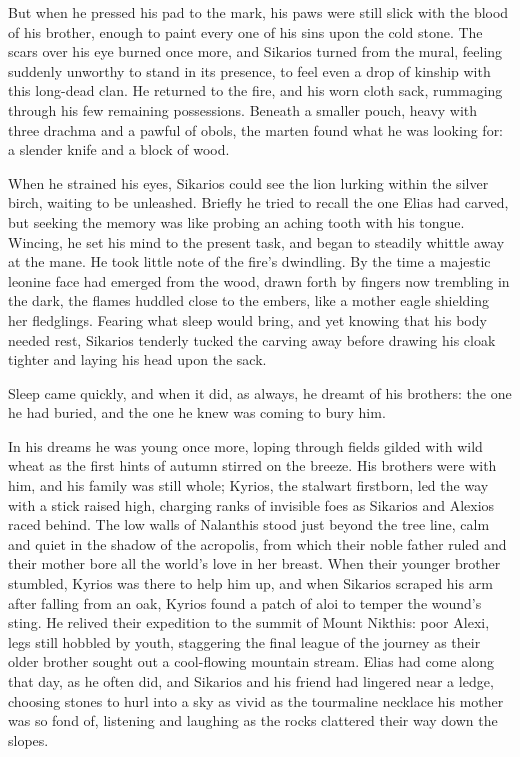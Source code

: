 But when he pressed his pad to the mark, his paws were still slick with the blood of his brother, enough to paint every one of his sins upon the cold stone. The scars over his eye burned once more, and Sikarios turned from the mural, feeling suddenly unworthy to stand in its presence, to feel even a drop of kinship with this long-dead clan. He returned to the fire, and his worn cloth sack, rummaging through his few remaining possessions. Beneath a smaller pouch, heavy with three drachma and a pawful of obols, the marten found what he was looking for: a slender knife and a block of wood.

When he strained his eyes, Sikarios could see the lion lurking within the silver birch, waiting to be unleashed. Briefly he tried to recall the one Elias had carved, but seeking the memory was like probing an aching tooth with his tongue. Wincing, he set his mind to the present task, and began to steadily whittle away at the mane. He took little note of the fire's dwindling. By the time a majestic leonine face had emerged from the wood, drawn forth by fingers now trembling in the dark, the flames huddled close to the embers, like a mother eagle shielding her fledglings. Fearing what sleep would bring, and yet knowing that his body needed rest, Sikarios tenderly tucked the carving away before drawing his cloak tighter and laying his head upon the sack.

Sleep came quickly, and when it did, as always, he dreamt of his brothers: the one he had buried, and the one he knew was coming to bury him.

\secdiv

In his dreams he was young once more, loping through fields gilded with wild wheat as the first hints of autumn stirred on the breeze. His brothers were with him, and his family was still whole; Kyrios, the stalwart firstborn, led the way with a stick raised high, charging ranks of invisible foes as Sikarios and Alexios raced behind. The low walls of Nalanthis stood just beyond the tree line, calm and quiet in the shadow of the acropolis, from which their noble father ruled and their mother bore all the world's love in her breast. When their younger brother stumbled, Kyrios was there to help him up, and when Sikarios scraped his arm after falling from an oak, Kyrios found a patch of aloi to temper the wound's sting. He relived their expedition to the summit of Mount Nikthis: poor Alexi, legs still hobbled by youth, staggering the final league of the journey as their older brother sought out a cool-flowing mountain stream. Elias had come along that day, as he often did, and Sikarios and his friend had lingered near a ledge, choosing stones to hurl into a sky as vivid as the tourmaline necklace his mother was so fond of, listening and laughing as the rocks clattered their way down the slopes.

